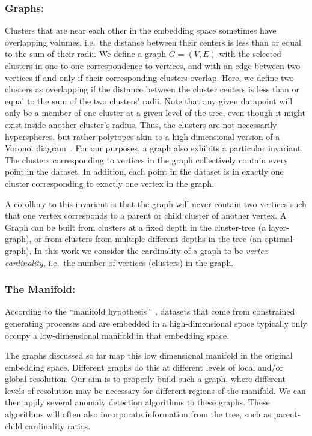 \subsubsection{Graphs:}
Clusters that are near each other in the embedding space sometimes have overlapping volumes, i.e.\ the distance between their centers is less than or equal to the sum of their radii.
We define a graph $G=(V,E)$ with the selected clusters in one-to-one correspondence to vertices, and with an edge between two vertices if and only if their corresponding clusters overlap.
Here, we define two clusters as overlapping if the distance between the cluster centers is less than or equal to the sum of the two clusters' radii.
Note that any given datapoint will only be a member of one cluster at a given level of the tree, even though it might exist inside another cluster's radius.
Thus, the clusters are not necessarily hyperspheres, but rather polytopes akin to a high-dimensional version of a Voronoi diagram~\cite{voronoi1908nouvelles}.
For our purposes, a graph also exhibits a particular invariant.
The clusters corresponding to vertices in the graph collectively contain every point in the dataset.
In addition, each point in the dataset is in exactly one cluster corresponding to exactly one vertex in the graph.

A corollary to this invariant is that the graph will never contain two vertices such that one vertex corresponds to a parent or child cluster of another vertex.
A Graph can be built from clusters at a fixed depth in the cluster-tree (a layer-graph), or from clusters from multiple different depths in the tree (an optimal-graph).
In this work we consider the cardinality of a graph to be \textit{vertex cardinality}, i.e.\ the number of vertices (clusters) in the graph.

\subsubsection{The Manifold:}
According to the ``manifold hypothesis''~\cite{fefferman2016testing},
datasets that come from constrained generating processes and are embedded in a high-dimensional space typically only occupy a low-dimensional manifold in that embedding space.

The graphs discussed so far map this low dimensional manifold in the original embedding space.
Different graphs do this at different levels of local and/or global resolution.
Our aim is to properly build such a graph, where different levels of resolution may be necessary for different regions of the manifold.
We can then apply several anomaly detection algorithms to these graphs.
These algorithms will often also incorporate information from the tree, such as parent-child cardinality ratios.

